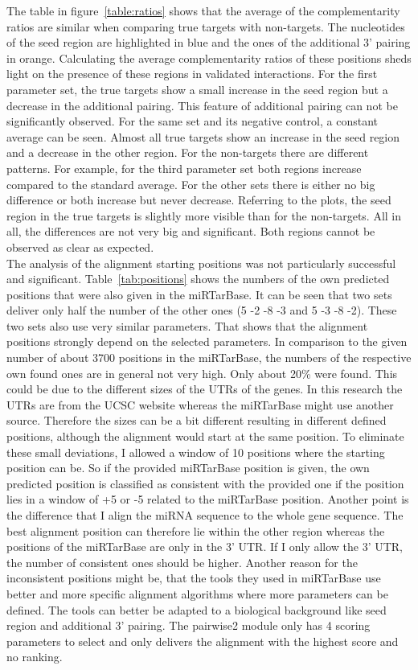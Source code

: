 \documentclass[11pt, a4paper, twoside]{book}
\begin{document}
The table in figure~\ref{table:ratios} shows that the average of the complementarity ratios are similar when comparing true targets with non-targets. The nucleotides of the seed region are highlighted in blue and the ones of the additional 3' pairing in orange. Calculating the average complementarity ratios of these positions sheds light on the presence of these regions in validated interactions. For the first parameter set, the true targets show a small increase in the seed region but a decrease in the additional pairing. This feature of additional pairing can not be significantly observed. For the same set and its negative control, a constant average can be seen. Almost all true targets show an increase in the seed region and a decrease in the other region. For the non-targets there are different patterns. For example, for the third parameter set both regions increase compared to the standard average. For the other sets there is either no big difference or both increase but never decrease. Referring to the plots, the seed region in the true targets is slightly more visible than for the non-targets. All in all, the differences are not very big and significant. Both regions cannot be observed as clear as expected.  \\

The analysis of the alignment starting positions was not particularly successful and significant. Table~\ref{tab:positions} shows the numbers of the own predicted positions that were also given in the miRTarBase. It can be seen that two sets deliver only half the number of the other ones (5 -2 -8 -3 and 5 -3 -8 -2). These two sets also use very similar parameters. That shows that the alignment positions strongly depend on the selected parameters. In comparison to the given number of about 3700 positions in the miRTarBase, the numbers of the respective own found ones are in general not very high. Only about 20\% were found. This could be due to the different sizes of the UTRs of the genes. In this research the UTRs are from the UCSC website whereas the miRTarBase might use another source. Therefore the sizes can be a bit different resulting in different defined positions, although the alignment would start at the same position. To eliminate these small deviations, I allowed a window of 10 positions where the starting position can be. So if the provided miRTarBase position is given, the own predicted position is classified as consistent with the provided one if the position lies in a window of +5 or -5 related to the miRTarBase position. Another point is the difference that I align the miRNA sequence to the whole gene sequence. The best alignment position can therefore lie within the other region whereas the positions of the miRTarBase are only in the 3' UTR. If I only allow the 3' UTR, the number of consistent ones should be higher. Another reason for the inconsistent positions might be, that the tools they used in miRTarBase use better and more specific alignment algorithms where more parameters can be defined. The tools can better be adapted to a biological background like seed region and additional 3' pairing. The pairwise2 module only has 4 scoring parameters to select and only delivers the alignment with the highest score and no ranking.  
\end{document}
